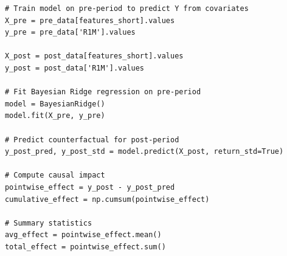 \begin{verbatim}
      # Train model on pre-period to predict Y from covariates                                      
      X_pre = pre_data[features_short].values                                                       
      y_pre = pre_data['R1M'].values                                                                
                                                                                                    
      X_post = post_data[features_short].values                                                     
      y_post = post_data['R1M'].values                                                              
                                                                                                    
      # Fit Bayesian Ridge regression on pre-period                                                 
      model = BayesianRidge()                                                                       
      model.fit(X_pre, y_pre)                                                                       
                                                                                                    
      # Predict counterfactual for post-period                                                      
      y_post_pred, y_post_std = model.predict(X_post, return_std=True)                              
                                                                                                    
      # Compute causal impact                                                                       
      pointwise_effect = y_post - y_post_pred                                                       
      cumulative_effect = np.cumsum(pointwise_effect)                                               
                                                                                                    
      # Summary statistics                                                                          
      avg_effect = pointwise_effect.mean()                                                          
      total_effect = pointwise_effect.sum()                                                         
                                                                                                    

\end{verbatim}
